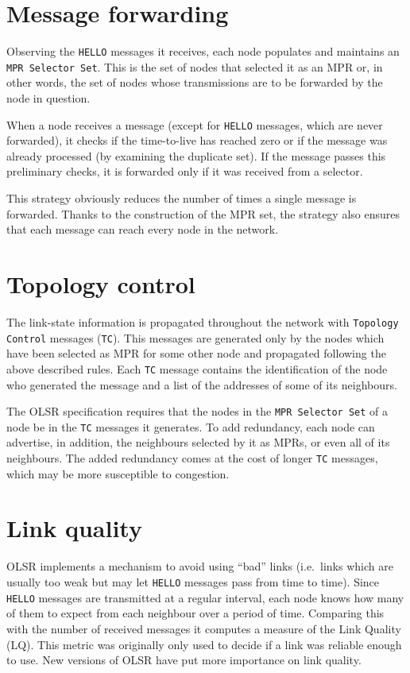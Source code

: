\documentclass[oneside,openany]{memoir}
\begin{document}
\section{Message forwarding}\label{message-forwarding}

Observing the \texttt{HELLO} messages it receives, each node populates
and maintains an \texttt{MPR Selector Set}. This is the set of nodes
that selected it as an MPR or, in other words, the set of nodes whose
transmissions are to be forwarded by the node in question.

When a node receives a message (except for \texttt{HELLO} messages,
which are never forwarded), it checks if the time-to-live has reached
zero or if the message was already processed (by examining the duplicate
set). If the message passes this preliminary checks, it is forwarded
only if it was received from a selector.

This strategy obviously reduces the number of times a single message is
forwarded. Thanks to the construction of the MPR set, the strategy also
ensures that each message can reach every node in the network.

\section{Topology control}\label{topology-control}

The link-state information is propagated throughout the network with
\texttt{Topology Control} messages (\texttt{TC}). This messages are
generated only by the nodes which have been selected as MPR for some
other node and propagated following the above described rules. Each
\texttt{TC} message contains the identification of the node who
generated the message and a list of the addresses of some of its
neighbours.

The OLSR specification requires that the nodes in the
\texttt{MPR Selector Set} of a node be in the \texttt{TC} messages it
generates. To add redundancy, each node can advertise, in addition, the
neighbours selected by it as MPRs, or even all of its neighbours. The
added redundancy comes at the cost of longer \texttt{TC} messages, which
may be more susceptible to congestion.

\section{Link quality}\label{link-quality}

OLSR implements a mechanism to avoid using ``bad'' links (i.e.~links
which are usually too weak but may let \texttt{HELLO} messages pass from
time to time). Since \texttt{HELLO} messages are transmitted at a
regular interval, each node knows how many of them to expect from each
neighbour over a period of time. Comparing this with the number of
received messages it computes a measure of the Link Quality (LQ). This
metric was originally only used to decide if a link was reliable enough
to use. New versions of OLSR have put more importance on link quality.
\end{document}
